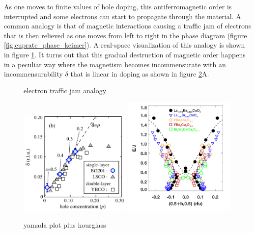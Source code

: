 As one moves to finite values of hole doping, this antiferromagnetic order is interrupted and some electrons can start to propagate through the material. A common analogy is that of magnetic interactions causing a traffic jam of electrons that is then relieved as one moves from left to right in the phase diagram (figure \ref{fig:cuprate_phase_keimer}). A real-space visualization of this analogy is shown in figure \ref{fig:electron_traffic_jam}. It turns out that this gradual destruction of magnetic order happens in a peculiar way where the magnetism becomes incommensurate with an incommensurability $\delta$ that is linear in doping as shown in figure \ref{fig:yamada_plot}A.

\begin{figure}
    \centering
    \caption[electron traffic jam analogy]{electron traffic jam analogy}
    \label{fig:electron_traffic_jam}
\end{figure}

\begin{figure}
    \centering
    \includegraphics[width=0.49\textwidth]{fig/intro/enoki_plot.png}
    \includegraphics[width=0.49\textwidth]{fig/intro/hourglass.png}
    \caption[yamada plot plus hourglass]{yamada plot plus hourglass}
    \label{fig:yamada_plot}
\end{figure}

